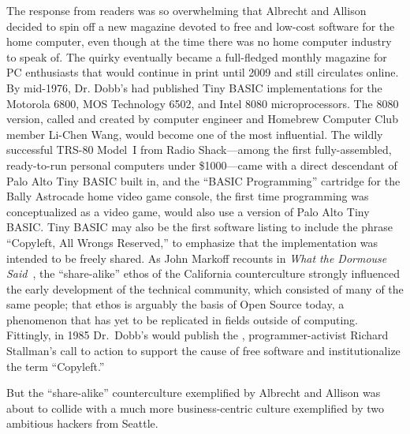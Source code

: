 The response from readers was so overwhelming that Albrecht and
Allison decided to spin off a new magazine devoted to free and
low-cost software for the home computer, even though at the time there
was no home computer industry to speak of.
The quirky  eventually became a full-fledged
monthly magazine for PC enthusiasts that would continue in print until
2009 and still circulates online.
By mid-1976, Dr. Dobb's had published Tiny BASIC implementations
for the Motorola 6800, MOS Technology 6502, and Intel 8080
microprocessors.
The 8080 version, called  and created by computer engineer
and Homebrew Computer Club member Li-Chen Wang, would become one of the
most influential.  The wildly successful TRS-80 Model~I from Radio Shack---among the first 
fully-assembled, ready-to-run
personal computers under \$1000---came with a direct descendant of
Palo Alto Tiny BASIC built in, and the 
``BASIC Programming'' cartridge for the Bally Astrocade
home video game console, the first time programming
was conceptualized as a video game,
would also use a version of Palo Alto Tiny
BASIC.
Tiny BASIC may also be the first software listing to include
the phrase ``Copyleft, All Wrongs Reserved,''
to emphasize that the
implementation was intended to be freely shared.
As John Markoff recounts in \emph{What the Dormouse Said}~\cite{dormouse},
the ``share-alike'' ethos of the California counterculture strongly
influenced the early development of the technical community, which
consisted of many of the same people; that ethos is arguably the
basis of Open Source today, a phenomenon that has yet to be replicated
in fields outside of computing.
Fittingly, in 1985 Dr.\ Dobb's would publish the ,
programmer-activist Richard Stallman's call to action to support the
cause of free software and institutionalize the term ``Copyleft.''

But the ``share-alike'' counterculture exemplified by Albrecht and
Allison was about to collide with a much more business-centric culture
exemplified by two ambitious hackers from Seattle.




